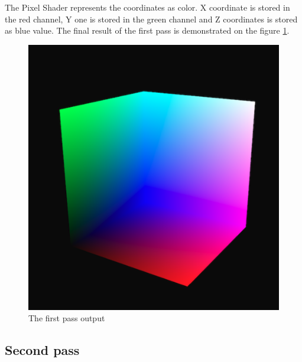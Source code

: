 \documentclass[twoside, english, 11pt]{report}
\begin{document}
The Pixel Shader represents the coordinates as color. X coordinate is stored in the red channel, Y one is stored in the green channel and Z coordinates is stored as blue value. The final result of the first pass is demonstrated on the figure \ref{fig:first}.
\begin{figure}[!h]
\centerline{\includegraphics[scale = 0.45]{img/first}}
\caption{The first pass output\label{fig:first}}
\end{figure}

\subsection{Second pass}
\end{document}
